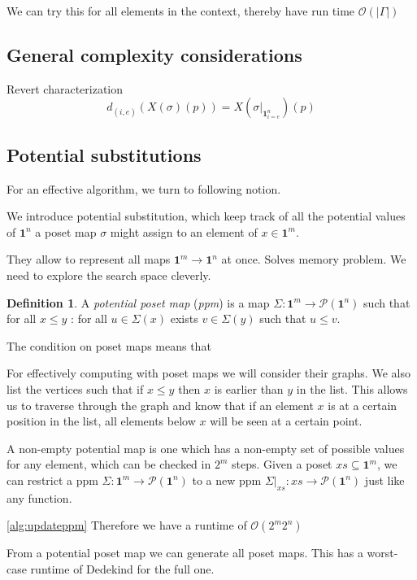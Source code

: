 \documentclass[11pt]{article}
\theoremstyle{definition}
\newtheorem{definition}{Definition}
\newcommand{\mname}[1]{\textit{{#1}}}
\newcommand{\pint}[1]{\mathbf{1}^{#1}}
\newcommand{\pintrestr}[3]{\mathbf{1}^{#1}_{{#2}={#3}}}
\newcommand{\restrict}[2]{{#1}|_{#2}}
\newcommand{\ctxtdim}[1]{|{#1}|}
\newcommand{\dmap}[2]{d_{({#1} , {#2})}}
\newcommand{\pow}[1]{\mathcal{P}({#1})}
\begin{document}
We can try this for all elements in the context, thereby have run time
$\mathcal{O}( \ctxtdim{\Gamma} )$

\subsection{General complexity considerations}


Revert characterization 
$$\dmap{i}{e}(X(\sigma)(p)) = X(\restrict{\sigma}{\pintrestr{n}{i}{e}})(p)$$


\subsection{Potential substitutions}

For an effective algorithm, we turn to following notion.

We introduce potential substitution, which keep track of all the potential
values of $\pint{n}$ a poset map $\sigma$ might assign to an element of $x \in \pint{m}$.

They allow to represent all maps $\pint{m} \to \pint{n}$ at once.
Solves memory problem. We need to explore the search space cleverly.

\begin{definition}
  A \mname{potential poset map} (\mname{ppm}) is a map $\Sigma : \pint{m} \to \pow{\pint{n}}$
  such that for all $x \leq y$ : for all $u \in \Sigma(x)$ exists $v \in
  \Sigma(y)$ such that $u \leq v$.
\end{definition}

The condition on poset maps means that 


For effectively computing with poset maps we will consider their graphs. We also
list the vertices such that if $x \leq y$ then $x$ is earlier than $y$ in the
list. This allows us to traverse through the graph and know that if an element
$x$ is at a certain position in the list, all elements below $x$ will be seen at
a certain point.

A non-empty potential map is one which has a non-empty set of possible values
for any element, which can be checked in $2^m$ steps. Given a poset $xs
\subseteq \pint{m}$, we can restrict a ppm $\Sigma : \pint{m} \to \pow{\pint{n}}$ to a
new ppm $\restrict{\Sigma}{xs} : xs \to \pow{\pint{n}}$ just like any function.

\autoref{alg:updateppm}
Therefore we have a runtime of $\mathcal{O}(2^m 2^n)$

From a potential poset map we can generate all poset maps. This has a worst-case
runtime of Dedekind for the full one.
\end{document}
